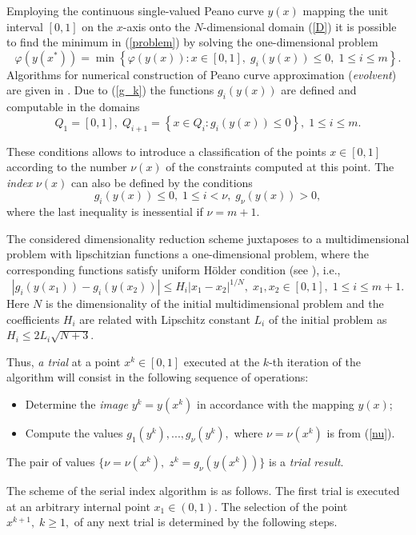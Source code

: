 \documentclass[smallextended]{svjour3}       %
\begin{document}
Employing the continuous single-valued Peano curve $y(x)$ mapping the unit interval $[0,1]$ on the $x$-axis onto the $N$-dimensional domain (\ref{D}) it is possible to find the minimum in (\ref{problem}) by solving the one-dimensional problem
\[
\varphi(y(x^\ast))=\min \left\{\varphi(y(x)): x \in [0,1], \; g_i(y(x))\leq 0, \; 1 \leq i \leq m\right\}.
\]
Algorithms for numerical construction of Peano curve approximation (\textit{evolvent}) are given in \cite{Sergeyev2013}. Due to (\ref{g_k}) the functions $g_i(y(x))$ are defined and computable in the domains 
\[
Q_1=[0,1], \; Q_{i+1}=\left\{x \in Q_i : g_i(y(x)) \leq 0 \right\}, \; 1 \leq i \leq m.
\]

These conditions allows to introduce a classification of the points $x \in [0,1]$ according to the number $\nu (x)$ of the constraints computed at this point. The \textit{index} $\nu(x)$ can also be defined by the conditions
\begin{equation}\label{nu}
g_i(y(x)) \leq 0, \; 1 \leq i < \nu, \; g_\nu(y(x))>0,
\end{equation}
where the last inequality is inessential if $\nu=m+1$.

The considered dimensionality reduction scheme juxtaposes to a multidimensional problem with lipschitzian functions a one-dimensional problem, where the corresponding functions satisfy uniform H{\"o}lder condition (see \cite{Sergeyev2013}), i.e.,
\[
\left|g_i(y(x_1))-g_i (y(x_2))\right| \leq H_i \left|x_1-x_2 \right|^{1/N}, \; x_1,x_2\in [0,1], \; 1\leq i \leq m+1.
\]
Here $N$ is the dimensionality of the initial multidimensional problem and the coefficients $H_i$ are related with Lipschitz constant $L_i$ of the initial problem as $H_i \leq 2L_i \sqrt{N+3}$.

Thus, \textit{a trial} at a point $x^k \in [0,1]$ executed at the $k$-th iteration of the algorithm will consist in the following sequence of operations:
\begin{itemize}
	\item Determine the \textit{image} $y^k=y(x^k)$ in accordance with the mapping $y(x)$;
	\item Compute the values $g_1(y^k),..., g_\nu(y^k),$ where $\nu = \nu(x^k)$ is from (\ref{nu}). 
\end{itemize}
The pair of values $ \{ \nu=\nu(x^k), \; z^k=g_\nu(y(x^k)) \} $ is a \textit{trial result}.

The scheme of the serial index algorithm is as follows. The first trial is executed at an arbitrary internal point $x_1 \in (0,1)$. The selection of the point $x^{k+1}, \; k \geq 1,$ of any next trial is determined by the following steps.
\end{document}
